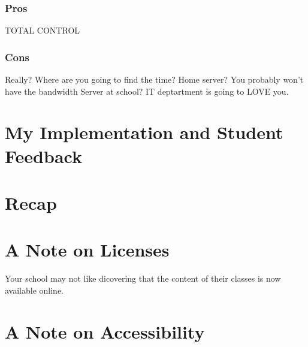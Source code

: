 \documentclass[sigconf]{acmart}
\begin{document}
\subsubsection{Pros}
TOTAL CONTROL
\subsubsection{Cons}

Really?  Where are you going to find the time?
Home server? You probably won't have the bandwidth
Server at school?  IT deptartment is going to LOVE you.


\section{My Implementation and Student Feedback}

\section{Recap}



\section{A Note on Licenses}



Your school may not like dicovering that the content of their classes is now available online.

\section{A Note on Accessibility}


\end{document}
